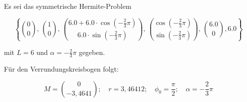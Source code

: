 \BEISPIEL
{
  Es sei das symmetrische Hermite-Problem 
  
  $$\left\{\binom{0}{0},\, \binom{1}{0},\,
  \binom{6.0+6.0\cdot \cos\left(-\frac{2}{3}\pi\right)}{6.0\cdot \sin\left(-\frac{2}{3}\pi\right)},\, \binom{\cos\left(-\frac{2}{3}\pi\right)}{\sin\left(-\frac{2}{3}\pi\right)},\, \binom{6.0}{0},6.0\right\}$$
  
  mit $L=6$ und $\alpha=-\frac{2}{3}\pi$ gegeben.
  
  Für den Verrundungskreisbogen folgt:
  
  $$M=\binom{0}{-3,4641}; \quad r=3,46412;\quad \phi_0 = \frac{\pi}{2}; \quad \alpha=-\frac{2}{3}\pi$$
  
  
  \begin{center}
  \end{center}  
}



